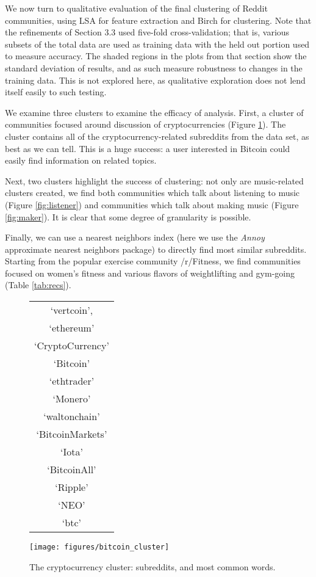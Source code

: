 \documentclass[]{article}
\begin{document}
We now turn to qualitative evaluation of the final clustering of Reddit communities, using LSA for feature extraction and Birch for clustering. Note that the refinements of Section 3.3 used five-fold cross-validation; that is, various subsets of the total data are used as training data with the held out portion used to measure accuracy. The shaded regions in the plots from that section show the standard deviation of results, and as such measure robustness to changes in the training data. This is not explored here, as qualitative exploration does not lend itself easily to such testing.

We examine three clusters to examine the efficacy of analysis. First, a cluster of communities focused around discussion of cryptocurrencies (Figure \ref{fig:crypto}). The cluster contains all of the cryptocurrency-related subreddits from the data set, as best as we can tell. This is a huge success: a user interested in Bitcoin could easily find information on related topics.

Next, two clusters highlight the success of clustering: not only are music-related clusters created, we find both communities which talk about listening to music (Figure \ref{fig:listener}) and communities which talk about making music (Figure \ref{fig:maker}). It is clear that some degree of granularity is possible.

Finally, we can use a nearest neighbors index (here we use the \emph{Annoy} approximate nearest neighbors package\cite{annoy}) to directly find most similar subreddits. Starting from the popular exercise community /r/Fitness, we find communities focused on women's fitness and various flavors of weightlifting and gym-going (Table \ref{tab:recs}).
 
 	\begin{figure}[htbp!]
		\centering
\begin{tabular}{c}
 `vertcoin', \\
 `ethereum' \\
 `CryptoCurrency' \\
 `Bitcoin' \\
 `ethtrader' \\
 `Monero' \\ 
 `waltonchain' \\
 `BitcoinMarkets' \\
 `Iota' \\
 `BitcoinAll' \\
 `Ripple' \\
 `NEO' \\
 `btc'
 \end{tabular}
		\texttt{[image: figures/bitcoin\_cluster]}
		\caption{The cryptocurrency cluster: subreddits, and most common words.}
		\label{fig:crypto}
	\end{figure}
\end{document}
